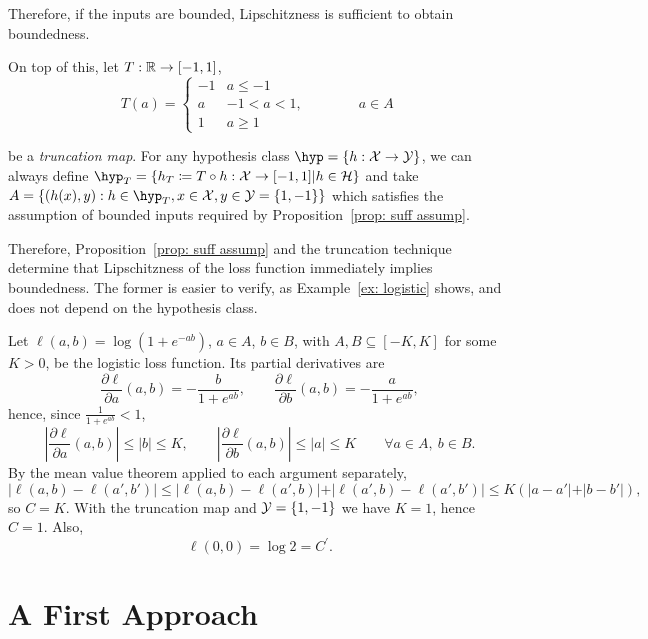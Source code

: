 \documentclass[reqno]{amsart}
\let\oldsection\section
\renewcommand{\section}{\clearpage\thispagestyle{plain}\oldsection}
\begin{document}
Therefore, if the inputs are bounded, Lipschitzness is sufficient to obtain boundedness.

On top of this,
let $T:\mathbb{R}\to[-1,1]$,
\begin{equation}
    T(a) = \begin{cases}
        -1 & a \le -1\\
        a & -1<a<1, \qquad\qquad a\in A\\
        1 & a\ge 1
    \end{cases}
\end{equation}

be a {\it truncation map\/}. 
For any hypothesis class $\hyp = \{h:\X\to\Y\}$, we can always define $\hyp_T=\{ h_T\coloneq T\circ h : \X\to[-1,1] \vert h\in\mathcal{H}\}$ and take $A = \{(h(x),y) : h\in\hyp_T, x\in\X, y\in\Y = \{1,-1\}\}$ which satisfies the assumption of bounded inputs required by Proposition~\ref{prop: suff assump}. 

Therefore, Proposition~\ref{prop: suff assump} and the truncation technique determine that Lipschitzness of the loss function immediately implies boundedness. The former is easier to verify, as Example~\ref{ex: logistic} shows, and does not depend on the hypothesis class.  

\begin{example}\label{ex: logistic}
    Let $\ell (a, b) = \log (1+e^{-ab})$, $a\in A$, $b\in B$, with $A,B\subseteq[-K,K]$ for some $K>0$, be the logistic loss function.
    Its partial derivatives are
    \[
    \frac{\partial \ell}{\partial a}(a,b) = -\frac{b}{1+e^{ab}}, \qquad \frac{\partial \ell}{\partial b}(a,b) = -\frac{a}{1+e^{ab}},
    \]
    hence, since $\frac{1}{1+e^{ab}}<1$,
    \[
    \left\vert \frac{\partial \ell}{\partial a}(a,b)\right\vert \le \vert b\vert \le K, \qquad \left\vert \frac{\partial \ell}{\partial b}(a,b)\right\vert \le \vert a\vert \le K \qquad \forall a\in A,\ b\in B.
    \]
    By the mean value theorem applied to each argument separately,
    \[
    \vert \ell(a,b)-\ell(a',b')\vert \le \vert \ell(a,b)-\ell(a',b)\vert + \vert \ell(a',b)-\ell(a',b')\vert \le K\left(\vert a-a'\vert + \vert b-b'\vert\right),
    \]
    so $C = K$. With the truncation map and $\mathcal{Y}=\{1,-1\}$ we have $K=1$, hence $C=1$.
    Also,
    \[
    \ell(0,0) = \log 2 = C^\prime.
    \]
\end{example}

\newpage
\section{A First Approach}\label{sec: unionbound}
\end{document}
